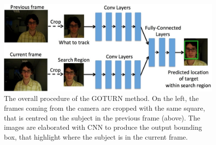 \begin{figure}[!h]
	\centering
	\includegraphics[width=1\linewidth]{images/tracking/howItWorks_GOTURN}
	\caption{The overall procedure of the GOTURN method. On the left, the frames coming from the camera are cropped with the same square, that is centred on the subject in the previous frame (above). The images are elaborated with CNN to produce the output bounding box, that highlight where the subject is in the current frame.}
	\label{fig:howItWorks_GOTURN}
\end{figure}
